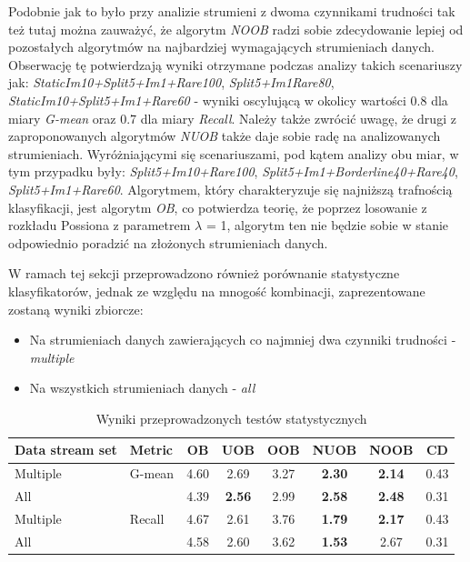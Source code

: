 \noindent Podobnie jak to było przy analizie strumieni z dwoma czynnikami trudności tak też tutaj można zauważyć, że algorytm \textit{NOOB} radzi sobie zdecydowanie lepiej od pozostałych algorytmów na najbardziej wymagających strumieniach danych. Obserwację tę potwierdzają wyniki otrzymane podczas analizy takich scenariuszy jak: \textit{StaticIm10+Split5+Im1+Rare100}, \textit{Split5+Im1Rare80}, \textit{StaticIm10+Split5+Im1+Rare60} - wyniki oscylującą w okolicy wartości 0.8 dla miary \textit{G-mean} oraz 0.7 dla miary \textit{Recall}. Należy także zwrócić uwagę, że drugi z zaproponowanych algorytmów \textit{NUOB} także daje sobie radę na analizowanych strumieniach. Wyróżniającymi się scenariuszami, pod kątem analizy obu miar, w tym przypadku były: \textit{Split5+Im10+Rare100}, \textit{Split5+Im1+Borderline40+Rare40}, \textit{Split5+Im1+Rare60}. Algorytmem, który charakteryzuje się najniższą trafnością klasyfikacji, jest algorytm \textit{OB}, co potwierdza teorię, że poprzez losowanie z rozkładu Possiona z parametrem $\lambda$ = 1, algorytm ten nie będzie sobie w stanie odpowiednio poradzić na złożonych strumieniach danych.

W ramach tej sekcji przeprowadzono również porównanie statystyczne klasyfikatorów, jednak ze względu na mnogość kombinacji, zaprezentowane zostaną wyniki zbiorcze:

\begin{itemize}
    \item Na strumieniach danych zawierających co najmniej dwa czynniki trudności - \textit{multiple}
    \item Na wszystkich strumieniach danych - \textit{all}
\end{itemize}

\begin{table}[ht]
\centering\small%
\setlength{\tabcolsep}{10pt} 
\renewcommand{\arraystretch}{1.5} 
\begin{tabular}{l l c c c c c c}
\toprule
Data stream set & Metric & OB & UOB & OOB & NUOB & NOOB & CD \\
\midrule
Multiple & G-mean & 4.60 & 2.69 & 3.27 & \textbf{2.30} & \textbf{2.14} & 0.43 \\
All  & & 4.39 & \textbf{2.56} & 2.99 & \textbf{2.58} & \textbf{2.48} & 0.31 \\
Multiple & Recall & 4.67 & 2.61 & 3.76 & \textbf{1.79} & \textbf{2.17} & 0.43\\
All  & & 4.58 & 2.60 & 3.62 & \textbf{1.53} & 2.67 & 0.31 \\
\bottomrule
\end{tabular}
\caption{Wyniki przeprowadzonych testów statystycznych}\label{Tab:ComplexFriedman}
\end{table}

